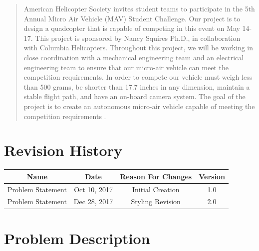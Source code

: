\documentclass[onecolumn, draftclsnofoot,10pt, compsoc]{IEEEtran}
\begin{document}
\begin{titlepage}
\begin{singlespace}
\begin{abstract}
        American Helicopter Society invites student teams to participate in the 5th Annual Micro Air Vehicle (MAV) Student Challenge. Our project is to design a quadcopter that is capable of competing in this event on May 14-17. This project is sponsored by Nancy Squires Ph.D., in collaboration with Columbia Helicopters. Throughout this project, we will be working in close coordination with a mechanical engineering team and an electrical engineering team to ensure that our micro-air vehicle can meet the competition requirements. In order to compete our vehicle must weigh less than 500 grams, be shorter than 17.7 inches in any dimension, maintain a stable flight path, and have an on-board camera system. The goal of the project is to create an autonomous micro-air vehicle capable of meeting the competition requirements \cite{r14}. 
        \end{abstract}     
    \end{singlespace}
\end{titlepage}
\newpage
{}
\tableofcontents
\clearpage


\section*{Revision History}

\begin{center}
    \begin{tabular}{|c|c|c|c|}
        \hline
		Name & Date & Reason For Changes & Version\\
        \hline
		Problem Statement & Oct 10, 2017 & Initial Creation & 1.0\\
		\hline 
		Problem Statement & Dec 28, 2017 & Styling Revision & 2.0\\
		\hline
    \end{tabular}
\end{center}



\section{Problem Description}
\end{document}
